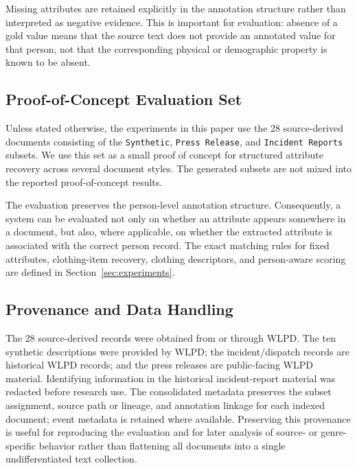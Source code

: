 \documentclass[sigconf,nonacm]{acmart}
\begin{document}
Missing attributes are retained explicitly in the annotation structure rather
than interpreted as negative evidence. This is important for evaluation:
absence of a gold value means that the source text does not provide an
annotated value for that person, not that the corresponding physical or
demographic property is known to be absent.

\subsection{Proof-of-Concept Evaluation Set}
\label{subsec:dataset-poc}

Unless stated otherwise, the experiments in this paper use the 28
source-derived documents consisting of the \texttt{Synthetic},
\texttt{Press Release}, and \texttt{Incident Reports} subsets. We use this set
as a small proof of concept for structured attribute recovery across several
document styles. The generated subsets are not mixed into the reported
proof-of-concept results.

The evaluation preserves the person-level annotation structure. Consequently,
a system can be evaluated not only on whether an attribute appears somewhere
in a document, but also, where applicable, on whether the extracted attribute
is associated with the correct person record. The exact matching rules for
fixed attributes, clothing-item recovery, clothing descriptors, and
person-aware scoring are defined in Section~\ref{sec:experiments}.

\subsection{Provenance and Data Handling}
\label{subsec:dataset-provenance}

The 28 source-derived records were obtained from or through WLPD. The ten
synthetic descriptions were provided by WLPD; the incident/dispatch
records are historical WLPD records; and the press releases are public-facing
WLPD material. Identifying information in the historical incident-report
material was redacted before research use. The consolidated metadata preserves
the subset assignment, source path or lineage, and annotation linkage for each
indexed document; event metadata is retained where available. Preserving this
provenance is useful for reproducing the evaluation and for later analysis of
source- or genre-specific behavior rather than flattening all documents into a
single undifferentiated text collection.
\end{document}
